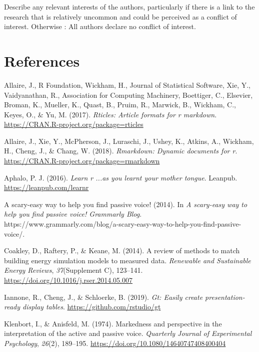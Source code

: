 \documentclass[]{elsarticle} %
\begin{document}
Describe any relevant interests of the authors, particularly if there is a link to the research that is relatively uncommon and could be perceived as a conflict of interest. Otherwise : All authors declare no conflict of interest.

\hypertarget{references}{%
\section*{References}\label{references}}

\hypertarget{refs}{}
\leavevmode\hypertarget{ref-rticles}{}%
Allaire, J., R Foundation, Wickham, H., Journal of Statistical Software, Xie, Y., Vaidyanathan, R., Association for Computing Machinery, Boettiger, C., Elsevier, Broman, K., Mueller, K., Quast, B., Pruim, R., Marwick, B., Wickham, C., Keyes, O., \& Yu, M. (2017). \emph{Rticles: Article formats for r markdown}. \url{https://CRAN.R-project.org/package=rticles}

\leavevmode\hypertarget{ref-rmarkdown}{}%
Allaire, J., Xie, Y., McPherson, J., Luraschi, J., Ushey, K., Atkins, A., Wickham, H., Cheng, J., \& Chang, W. (2018). \emph{Rmarkdown: Dynamic documents for r}. \url{https://CRAN.R-project.org/package=rmarkdown}

\leavevmode\hypertarget{ref-ggpmisc}{}%
Aphalo, P. J. (2016). \emph{Learn r ...as you learnt your mother tongue}. Leanpub. \url{https://leanpub.com/learnr}

\leavevmode\hypertarget{ref-ScaryeasyWayHelp2014}{}%
A scary-easy way to help you find passive voice! (2014). In \emph{A scary-easy way to help you find passive voice! \textbar{} Grammarly Blog}. https://www.grammarly.com/blog/a-scary-easy-way-to-help-you-find-passive-voice/.

\leavevmode\hypertarget{ref-coakleyReviewMethodsMatch2014}{}%
Coakley, D., Raftery, P., \& Keane, M. (2014). A review of methods to match building energy simulation models to measured data. \emph{Renewable and Sustainable Energy Reviews}, \emph{37}(Supplement C), 123--141. \url{https://doi.org/10.1016/j.rser.2014.05.007}

\leavevmode\hypertarget{ref-gt}{}%
Iannone, R., Cheng, J., \& Schloerke, B. (2019). \emph{Gt: Easily create presentation-ready display tables}. \url{https://github.com/rstudio/gt}

\leavevmode\hypertarget{ref-klenbortMarkednessPerspectiveInterpretation1974}{}%
Klenbort, I., \& Anisfeld, M. (1974). Markedness and perspective in the interpretation of the active and passive voice. \emph{Quarterly Journal of Experimental Psychology}, \emph{26}(2), 189--195. \url{https://doi.org/10.1080/14640747408400404}
\end{document}
